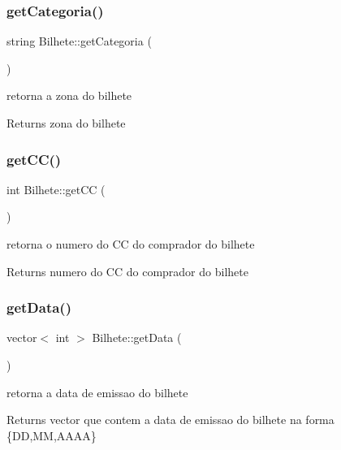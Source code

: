 \subsubsection{\texorpdfstring{get\+Categoria()}{getCategoria()}}
{\footnotesize\ttfamily string Bilhete\+::get\+Categoria (\begin{DoxyParamCaption}{ }\end{DoxyParamCaption})}

retorna a zona do bilhete \begin{DoxyReturn}{Returns}
zona do bilhete 
\end{DoxyReturn}
\mbox{\label{class_bilhete_a328c577511937f1ab79d9e785dd18564}} 
\subsubsection{\texorpdfstring{get\+C\+C()}{getCC()}}
{\footnotesize\ttfamily int Bilhete\+::get\+CC (\begin{DoxyParamCaption}{ }\end{DoxyParamCaption})}

retorna o numero do CC do comprador do bilhete \begin{DoxyReturn}{Returns}
numero do CC do comprador do bilhete 
\end{DoxyReturn}
\mbox{\label{class_bilhete_a89a41aff919d6acb173acc708367f2d3}} 
\subsubsection{\texorpdfstring{get\+Data()}{getData()}}
{\footnotesize\ttfamily vector$<$ int $>$ Bilhete\+::get\+Data (\begin{DoxyParamCaption}{ }\end{DoxyParamCaption})}

retorna a data de emissao do bilhete \begin{DoxyReturn}{Returns}
vector que contem a data de emissao do bilhete na forma \{DD,MM,A\+A\+AA\} 
\end{DoxyReturn}
\mbox{\label{class_bilhete_adf630342c192da168a75e6bc983d7801}} 
